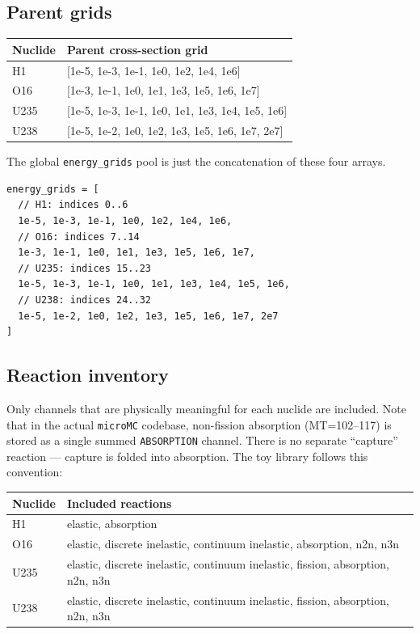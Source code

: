 \documentclass[11pt,a4paper]{article}
\begin{document}
\subsection{Parent grids}
\begin{longtable}{>{\ttfamily}p{1.7cm} p{10.5cm}}
\toprule
Nuclide & Parent cross-section grid \\
\midrule
H1 & [1e-5, 1e-3, 1e-1, 1e0, 1e2, 1e4, 1e6] \\
O16 & [1e-3, 1e-1, 1e0, 1e1, 1e3, 1e5, 1e6, 1e7] \\
U235 & [1e-5, 1e-3, 1e-1, 1e0, 1e1, 1e3, 1e4, 1e5, 1e6] \\
U238 & [1e-5, 1e-2, 1e0, 1e2, 1e3, 1e5, 1e6, 1e7, 2e7] \\
\bottomrule
\end{longtable}

The global \texttt{energy\_grids} pool is just the concatenation of these four arrays.

\begin{lstlisting}
energy_grids = [
  // H1: indices 0..6
  1e-5, 1e-3, 1e-1, 1e0, 1e2, 1e4, 1e6,
  // O16: indices 7..14
  1e-3, 1e-1, 1e0, 1e1, 1e3, 1e5, 1e6, 1e7,
  // U235: indices 15..23
  1e-5, 1e-3, 1e-1, 1e0, 1e1, 1e3, 1e4, 1e5, 1e6,
  // U238: indices 24..32
  1e-5, 1e-2, 1e0, 1e2, 1e3, 1e5, 1e6, 1e7, 2e7
]
\end{lstlisting}

\subsection{Reaction inventory}
Only channels that are physically meaningful for each nuclide are included. Note that in the actual \texttt{microMC} codebase, non-fission absorption (MT=102--117) is stored as a single summed \texttt{ABSORPTION} channel. There is no separate ``capture'' reaction --- capture is folded into absorption. The toy library follows this convention:
\begin{longtable}{>{\ttfamily}p{1.7cm} p{10.8cm}}
\toprule
Nuclide & Included reactions \\
\midrule
H1 & elastic, absorption \\
O16 & elastic, discrete inelastic, continuum inelastic, absorption, n2n, n3n \\
U235 & elastic, discrete inelastic, continuum inelastic, fission, absorption, n2n, n3n \\
U238 & elastic, discrete inelastic, continuum inelastic, fission, absorption, n2n, n3n \\
\bottomrule
\end{longtable}
\end{document}
